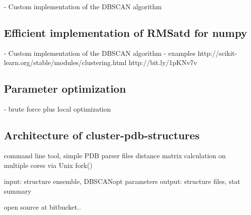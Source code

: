         - Custom implementation of the DBSCAN algorithm

\subsection{Efficient implementation of RMSatd for numpy}

        - Custom implementation of the DBSCAN algorithm
        - examples
            http://scikit-learn.org/stable/modules/clustering.html
            http://bit.ly/1pKNv7v


\subsection{Parameter optimization}

        - brute force plus local optimization

\subsection{Architecture of cluster-pdb-structures}

            command line tool, simple PDB parser files
            distance matrix calculation on multiple cores via Unix fork()

            input: structure ensemble, DBSCANopt parameters
            output: structure files, stat summary


            open source at bitbucket..


